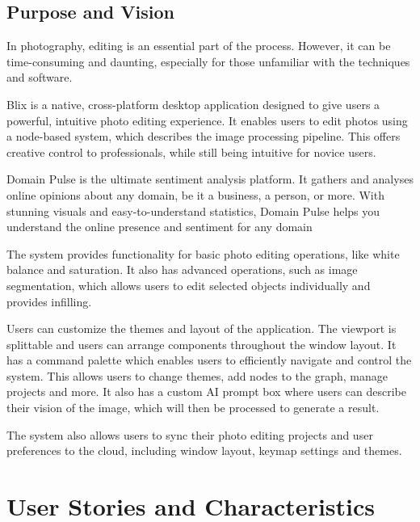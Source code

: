 \documentclass[11pt,a4paper]{article}
\begin{document}
\subsection*{Purpose and Vision}

In photography, editing is an essential part of the process. However, it can be
time-consuming and daunting, especially for those unfamiliar with the techniques
and software. 

Blix is a native, cross-platform desktop application designed to give users a
powerful, intuitive photo editing experience. It enables users to edit photos 
using a node-based system, which describes the image processing pipeline. This
offers creative control to professionals, while still being intuitive for 
novice users.

Domain Pulse is the ultimate sentiment analysis platform. It gathers and analyses
online opinions about any domain, be it a business, a person, or more. With stunning
visuals and easy-to-understand statistics, Domain Pulse helps you understand the
online presence and sentiment for any domain

The system provides functionality for basic photo editing operations, like white
balance and saturation. It also has advanced operations, such as image
segmentation, which allows users to edit selected objects individually and
provides infilling. 

Users can customize the themes and layout of the application. The viewport is
splittable and users can arrange components throughout the window layout. It has
a command palette which enables users to efficiently navigate and control the
system. This allows users to change themes, add nodes to the graph, manage
projects and more. It also has a custom AI prompt box where users can describe
their vision of the image, which will then be processed to generate a result.

The system also allows users to sync their photo editing projects and user
preferences to the cloud, including window layout, keymap settings and themes.

\pagebreak


\section*{User Stories and Characteristics}

\end{document}
